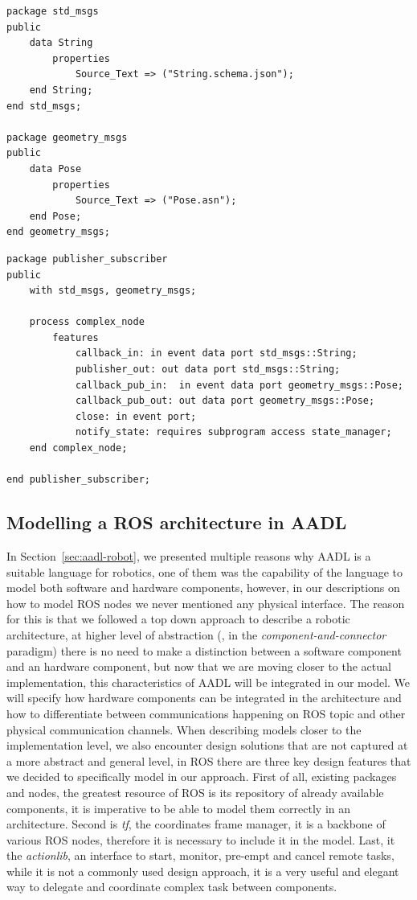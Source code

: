 \begin{lstlisting}[language=AADL,caption={Definition of ROS messages using AADL data components.},label=lst:message-example]
package std_msgs
public
	data String
		properties
			Source_Text => ("String.schema.json");
	end String;
end std_msgs;

package geometry_msgs
public
	data Pose
		properties
			Source_Text => ("Pose.asn");
	end Pose;
end geometry_msgs;
\end{lstlisting}

\begin{lstlisting}[language=AADL,caption={Use of AADL data component to specify the data type of a port.},label=lst:message-use-example]
package publisher_subscriber
public
	with std_msgs, geometry_msgs;

	process complex_node
		features
			callback_in: in event data port std_msgs::String;
			publisher_out: out data port std_msgs::String;
			callback_pub_in:  in event data port geometry_msgs::Pose;
			callback_pub_out: out data port geometry_msgs::Pose;
			close: in event port;
			notify_state: requires subprogram access state_manager;
	end complex_node;

end publisher_subscriber;
\end{lstlisting}

\subsection{Modelling a ROS architecture in AADL}
\label{sec:ros-arch}
In Section~\ref{sec:aadl-robot}, we presented multiple reasons why AADL is a suitable language for robotics, one of them was the capability of the language to model both software and hardware components, however, in our descriptions on how to model ROS nodes we never mentioned any physical interface. The reason for this is that we followed a top down approach to describe a robotic architecture, at higher level of abstraction (\ie, in the \textit{component-and-connector} paradigm) there is no need to make a distinction between a software component and an hardware component, but now that we are moving closer to the actual implementation, this characteristics of AADL will be integrated in our model. We will specify how hardware components can be integrated in the architecture and how to differentiate between communications happening on ROS topic and other physical communication channels. When describing models closer to the implementation level, we also encounter design solutions that are not captured at a more abstract and general level, in ROS there are three key design features that we decided to specifically model in our approach. First of all, existing packages and nodes, the greatest resource of ROS is its repository of already available components, it is imperative to be able to model them correctly in an architecture. Second is \textit{tf}, the coordinates frame manager, it is a backbone of various ROS nodes, therefore it is necessary to include it in the model. Last, it the \textit{actionlib}, an interface to start, monitor, pre-empt and cancel remote tasks, while it is not a commonly used design approach, it is a very useful and elegant way to delegate and coordinate complex task between components.

